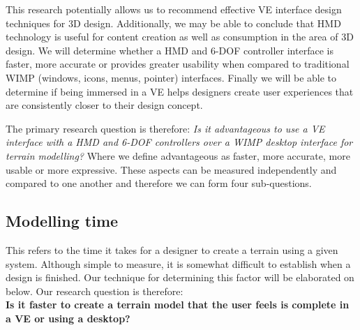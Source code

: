 \documentclass{sig-alternate-05-2015}
\begin{document}
This research potentially allows us to recommend effective VE interface design techniques for 3D design. Additionally, we may be able to conclude that HMD technology is useful for content creation as well as consumption in the area of 3D design. We will determine whether a HMD and 6-DOF controller interface is faster, more accurate or provides greater usability when compared to traditional WIMP (windows, icons, menus, pointer) interfaces. Finally we will be able to determine if being immersed in a VE helps designers create user experiences that are consistently closer to their design concept.

The primary research question is therefore: \textit{Is it advantageous to use a VE interface with a HMD and 6-DOF controllers over a WIMP desktop interface for terrain modelling?}
Where we define advantageous as faster, more accurate, more usable or more expressive. These aspects can be measured independently and compared to one another and therefore we can form four sub-questions.
\subsection{Modelling time}
This refers to the time it takes for a designer to create a terrain using a given system. Although simple to measure, it is somewhat difficult to establish when a design is finished. Our technique for determining this factor will be elaborated on below. Our research question is therefore:\\
\textbf{Is it faster to create a terrain model that the user feels is complete in a VE or using a desktop?}\\
\end{document}
